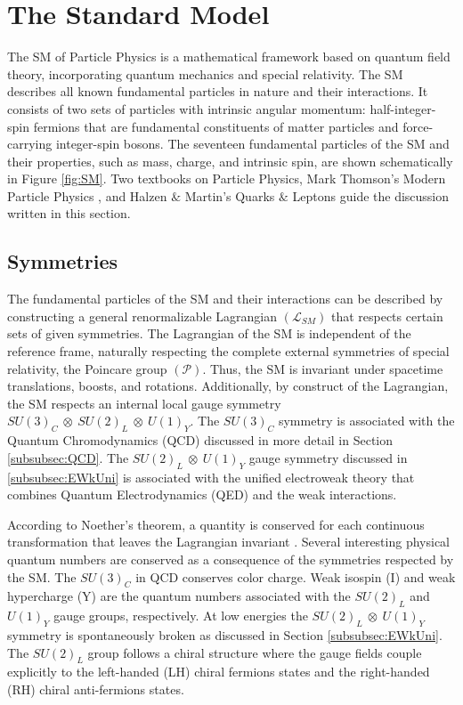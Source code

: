 \section{The Standard Model}
\label{sec:SM}

The SM of Particle Physics is a mathematical framework based on quantum field theory, incorporating quantum mechanics and special relativity. The SM describes all known fundamental particles in nature and their interactions. It consists of two sets of particles with intrinsic angular momentum: half-integer-spin fermions that are fundamental constituents of matter particles and force-carrying integer-spin bosons. The seventeen fundamental particles of the SM and their properties, such as mass, charge, and intrinsic spin, are shown schematically in Figure \ref{fig:SM}. Two textbooks on Particle Physics, Mark Thomson's Modern Particle Physics \cite{Thomson:2013zua}, and Halzen $\&$ Martin's Quarks $\&$ Leptons \cite{Halzen:1984mc} guide the discussion written in this section.

\subsection{Symmetries}
\label{subsec:Symmetries}
The fundamental particles of the SM and their interactions can be described by constructing a general renormalizable Lagrangian $(\mathcal{L}_{SM})$ that respects certain sets of given symmetries. The Lagrangian of the SM is independent of the reference frame, naturally respecting the complete external symmetries of special relativity, the Poincare group $(\mathcal{P})$. Thus, the SM is invariant under spacetime translations, boosts, and rotations. Additionally, by construct of the Lagrangian, the SM respects an internal local gauge symmetry $SU(3)_{C}~\otimes~SU(2)_{L}~\otimes~U(1)_{Y}$. The $SU(3)_{C}$ symmetry is associated with the Quantum Chromodynamics (QCD) discussed in more detail in Section \ref{subsubsec:QCD}. The $SU(2)_{L}~\otimes~U(1)_{Y}$ gauge symmetry discussed in \ref{subsubsec:EWkUni} is associated with the unified electroweak theory that combines Quantum Electrodynamics (QED) and the weak interactions. 

According to Noether's theorem, a quantity is conserved for each continuous transformation that leaves the Lagrangian invariant \cite{NoetherTheorem}. Several interesting physical quantum numbers are conserved as a consequence of the symmetries respected by the SM. The $SU(3)_{C}$ in QCD conserves color charge. Weak isospin (I) and weak hypercharge (Y) are the quantum numbers associated with the $SU(2)_{L}$ and $U(1)_{Y}$ gauge groups, respectively. At low energies the $SU(2)_{L}~\otimes~U(1)_{Y}$ symmetry is spontaneously broken as discussed in Section \ref{subsubsec:EWkUni}. The $SU(2)_{L}$ group follows a chiral structure where the gauge fields couple explicitly to the left-handed (LH) chiral fermions states and the right-handed (RH) chiral anti-fermions states.

